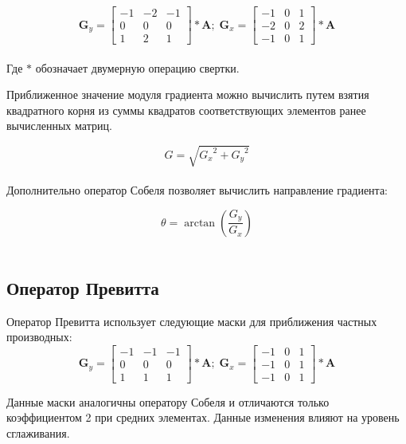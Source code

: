 \begin{equation}
\mathbf{G}_y =
\begin{bmatrix}
    -1 & -2 & -1\\
    0 & 0 & 0 \\
    1 & 2 & 1    
\end{bmatrix}
\ast \mathbf{A}
;\;
\mathbf{G}_x =
\begin{bmatrix}
    -1 & 0 & 1\\
    -2 & 0 & 2 \\
    -1 & 0 & 1 
\end{bmatrix}
\ast \mathbf{A}
\end{equation}
\\
Где $\ast$ обозначает двумерную операцию свертки.

Приближенное значение модуля градиента можно вычислить путем взятия квадратного корня из суммы квадратов соответствующих элементов ранее вычисленных матриц.

\begin{equation}
G = \sqrt{{G_x}^2 + {G_y}^2}
\end{equation}\\

Дополнительно оператор Собеля позволяет вычислить направление градиента:

\begin{equation}
\theta = \arctan \left( \frac{G_y}{G_x} \right)  
\end{equation}\\
\subsection{Оператор Превитта}
Оператор Превитта использует следующие маски для приближения частных производных:
\begin{equation}\label{eq:prewitt}
\mathbf{G}_y =
\begin{bmatrix}
-1 & -1 & -1\\
0 & 0 & 0 \\
1 & 1 & 1    
\end{bmatrix}
\ast \mathbf{A}
;\;
\mathbf{G}_x =
\begin{bmatrix}
-1 & 0 & 1\\
-1 & 0 & 1 \\
-1 & 0 & 1 
\end{bmatrix}
\ast \mathbf{A}
\end{equation}

Данные маски аналогичны оператору Собеля и отличаются только коэффициентом 2 при средних элементах. Данные изменения влияют на уровень сглаживания.
